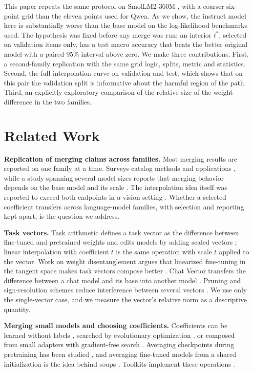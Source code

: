 \documentclass[conference]{IEEEtran}
\begin{document}
This paper repeats the same protocol on SmolLM2-360M \cite{allal2025smollm2}, with a coarser six-point grid than the eleven points used for Qwen. As we show, the instruct model here is substantially worse than the base model on the log-likelihood benchmarks used. The hypothesis was fixed before any merge was run: an interior $t^\ast$, selected on validation items only, has a test macro accuracy that beats the better original model with a paired 95\% interval above zero. We make three contributions. First, a second-family replication with the same grid logic, splits, metric and statistics. Second, the full interpolation curve on validation and test, which shows that on this pair the validation split is informative about the harmful region of the path. Third, an explicitly exploratory comparison of the relative size of the weight difference in the two families.

\section{Related Work}
\textbf{Replication of merging claims across families.} Most merging results are reported on one family at a time. Surveys catalog methods and applications \cite{yang2024survey,li2023fusion}, while a study spanning several model sizes reports that merging behavior depends on the base model and its scale \cite{yadav2024scale}. The interpolation idea itself was reported to exceed both endpoints in a vision setting \cite{wortsman2022wise}. Whether a selected coefficient transfers across language-model families, with selection and reporting kept apart, is the question we address.

\textbf{Task vectors.} Task arithmetic defines a task vector as the difference between fine-tuned and pretrained weights and edits models by adding scaled vectors \cite{ilharco2023taskarith}; linear interpolation with coefficient $t$ is the same operation with scale $t$ applied to the vector. Work on weight disentanglement argues that linearized fine-tuning in the tangent space makes task vectors compose better \cite{ortiz2023tangent}. Chat Vector transfers the difference between a chat model and its base into another model \cite{huang2023chatvector}. Pruning and sign-resolution schemes reduce interference between several vectors \cite{yadav2023ties,yu2024dare}. We use only the single-vector case, and we measure the vector's relative norm as a descriptive quantity.

\textbf{Merging small models and choosing coefficients.} Coefficients can be learned without labels \cite{yang2024adamerging}, searched by evolutionary optimization \cite{akiba2024evolutionary}, or composed from small adapters with gradient-free search \cite{huang2024lorahub}. Averaging checkpoints during pretraining has been studied \cite{sanyal2023lawa,liu2024checkpoint}, and averaging fine-tuned models from a shared initialization is the idea behind soups \cite{wortsman2022soups}. Toolkits implement these operations \cite{goddard2024mergekit}.
\end{document}

